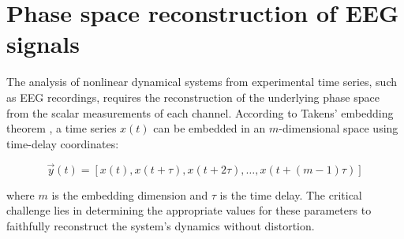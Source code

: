 \documentclass{article}
\begin{document}

	\newpage

		\section{Phase space reconstruction of EEG signals}

			The analysis of nonlinear dynamical systems from experimental time series, such as EEG recordings, requires 
			the reconstruction of the underlying phase space from the scalar measurements of each channel. 
			According to Takens' embedding theorem \cite{takens1981}, a time series $x(t)$ can be embedded 
			in an $m$-dimensional space using time-delay coordinates:

			\begin{equation}
			\vec{y}(t) = \left[x(t), x(t+\tau), x(t+2\tau), \ldots, x(t+(m-1)\tau)\right]
			\end{equation}

			where $m$ is the embedding dimension and $\tau$ is the time delay. The critical challenge lies in determining the appropriate values for these parameters to faithfully reconstruct the system's dynamics without distortion.
\end{document}
